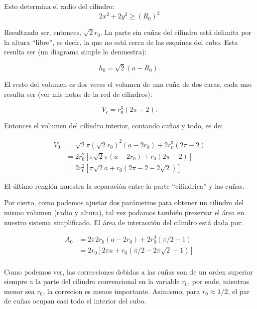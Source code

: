 \documentclass[letterpaperr,12pt]{article}
\begin{document}
Esto determina el radio del cilindro:
\begin{equation}
2x^2+2y^2 \ge (R_0)^2
\end{equation}

Resultando ser, entonces, $\sqrt{2} r_0$.
La parte sin cuñas del cilindro está delimita por la altura
``libre'', es decir, la que no está cerca de las esquinas del cubo. 
Esta resulta ser (un diagrama simple lo demuestra):

\begin{equation}
h_0=\sqrt{2} (a-R_0).
\end{equation} 

El resto del volumen es dos veces el volumen de una cuña de dos caras,
cada uno resulta ser (ver mis notas de la red de cilindros):

\begin{equation}
V_c=r_0^3 (2\pi-2).
\end{equation}

Entonces el volumen del cilíndro interior, contando cuñas y todo, es de:

\begin{align}
V_0 &= \sqrt{2} \pi (\sqrt{2} r_0)^2 (a-2 r_0)+ 2r_0^3 (2\pi-2)\\
&= 2  r_0^2 [\pi \sqrt{2} \pi (a - 2 r_0) + r_0 (2\pi-2) ] \\
&= 2  r_0^2 [ \pi \sqrt{2} a  + r_0 (2\pi-2-2 \sqrt{2}) ] 
\end{align}


El último renglón muestra la separación entre la parte
``cilíndrica'' y las cuñas.

Por cierto, como podemos ajustar dos parámetros para obtener
un cilindro del mismo volumen (radio y altura), tal vez podamos
también preservar el área en nuestro sistema simplificado.
El área de interacción del cilindro está dada por:

\begin{align}
A_0 &= 2\pi 2 r_0 (a-2 r_0)+ 2 r_0^2(\pi/2-1)\\
&= 2 r_0 [2\pi a +  r_0 (\pi/2-2\pi\sqrt{2}-1)]\\
\end{align}

Como podemos ver, las correcciones debidas a las cuñas son
de un orden superior siempre a la parte del cilindro convencional en
la variable $r_0$, por ende, mientras menor sea $r_0$, la correcion 
es menos importante. Asimismo, para $r_0 \approx 1/2$, el par de cuñas ocupan
casi todo el interior del cubo. 
\end{document}
